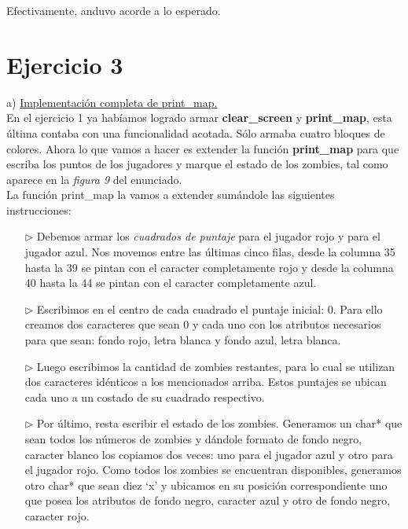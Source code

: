 \documentclass[a4paper]{article}
\begin{document}
Efectivamente, anduvo acorde a lo esperado.
\newpage
\section{Ejercicio 3}


{\large a)} \underline{Implementaci\'on completa de print_map.} \\

En el ejercicio 1 ya hab\'iamos logrado armar \textbf{clear_screen} y \textbf{print_map}, esta \'ultima contaba con una funcionalidad acotada. S\'olo armaba cuatro bloques de colores. Ahora lo que vamos a hacer es extender la funci\'on \textbf{print_map} para que escriba los puntos de los jugadores y marque el estado de los zombies, tal como aparece en la \textit{figura 9} del enunciado.\\


La funci\'on print_map la vamos a extender sum\'andole las siguientes instrucciones:

\begin{itemize}
\item[$\triangleright$] Debemos armar los \emph{cuadrados de puntaje} para el jugador rojo y para el jugador azul. Nos movemos entre las \'ultimas cinco filas, desde la columna 35 hasta la 39 se pintan con el caracter completamente rojo y desde la columna 40 hasta la 44 se pintan con el caracter completamente azul.
\item[$\triangleright$] Escribimos en el centro de cada cuadrado el puntaje inicial: 0. Para ello creamos dos caracteres que sean 0 y cada uno con los atributos necesarios para que sean: fondo rojo, letra blanca y fondo azul, letra blanca.
\item[$\triangleright$] Luego escribimos la cantidad de zombies restantes, para lo cual se utilizan dos caracteres id\'enticos a los mencionados arriba. Estos puntajes se ubican cada uno a un costado de su cuadrado respectivo.
\item[$\triangleright$] Por \'ultimo, resta escribir el estado de los zombies. Generamos un char* que sean todos los n\'umeros de zombies y d\'andole formato de fondo negro, caracter blanco los copiamos dos veces: uno para el jugador azul y otro para el jugador rojo. Como todos los zombies se encuentran disponibles, generamos otro char* que sean diez `x' y ubicamos en su posici\'on correspondiente uno que posea los atributos de fondo negro, caracter azul y otro de fondo negro, caracter rojo.
\end{itemize}
\end{document}
